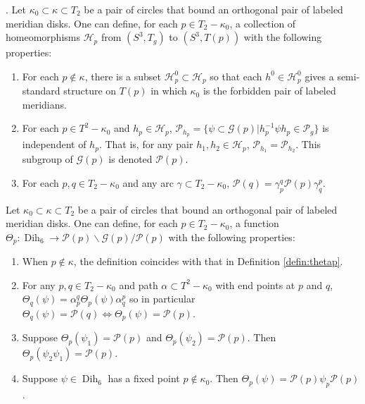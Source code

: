 \documentclass[10pt,a4paper]{amsart}
\newcommand{\Dih}{\operatorname{Dih}}
\newcommand{\bs}{\backslash}
\newcommand{\calG}{\mathcal G}
\newcommand{\calH}{\mathcal H}
\newcommand{\calP}{\mathcal P}
\begin{document}
\begin{prop}. \label{prop:thetastar}  Let $\kappa_0 \subset \kappa \subset T_2$ be a pair of circles that bound an orthogonal pair of labeled meridian disks.  One can define, for each $p \in T_2 - \kappa_0$, a collection of homeomorphisms $\calH_p$ from $(S^3, T_g)$ to $(S^3, T(p))$ with the following properties:
\begin{enumerate}
\item For each $p \notin \kappa$, there is a subset $\calH_p^0 \subset \calH_p$ so that each $h^0 \in \calH_p^0$ gives a semi-standard structure on $T(p)$ in which $\kappa_0$ is the forbidden pair of labeled meridians.
\item For each $p \in T^2 - \kappa_0$ and $h_p \in \calH_p$, $\calP_{h_p} = \{\psi \subset \calG(p) | h_p^{-1} \psi h_p \in \calP_g\}$ is independent of $h_p$.  That is, for any pair $h_1, h_2 \in \calH_p$, $\calP_{h_1} = \calP_{h_2}$.  This subgroup of $\calG(p)$ is denoted $\calP(p)$.  
\item For each $p, q \in T_2 - \kappa_0$ and any arc $\gamma \subset T_2 - \kappa_0$, $\calP(q) = \gamma_p^q \calP(p) \gamma_q^p$.
\end{enumerate}
\end{prop}

\begin{prop} \label{prop:dihedral}  Let $\kappa_0 \subset \kappa \subset T_2$ be a pair of circles that bound an orthogonal pair of labeled meridian disks.  One can define, for each $p \in T_2 - \kappa_0$, a function $\Theta_p: \Dih_6 \to \calP(p) \bs \calG(p)/\calP(p)$ with the following properties:
\begin{enumerate}
\item  When $p \notin \kappa$, the definition coincides with that in Definition \ref{defin:thetap}.
\item  For any $p, q \in T_2 - \kappa_0$ and path $\alpha \subset T^2 - \kappa_0$ with end points at $p$ and $q$, $\Theta_q(\psi) = \alpha_p^q \Theta_p(\psi) \alpha_q^p$ so in particular 
$\Theta_q(\psi) = \calP(q) \iff \Theta_p(\psi) = \calP(p)$.
\item  Suppose $\Theta_p (\psi_1) = \calP(p)$ and $\Theta_p (\psi_2) = \calP(p)$.  Then $\Theta_p (\psi_2 \psi_1) = \calP(p)$.
\item Suppose $\psi \in \Dih_6$ has a fixed point $p \notin \kappa_0$.  Then $\Theta_p(\psi) = \calP(p)\psi_p \calP(p)$.   
\end{enumerate}
\end{prop}
\end{document}

